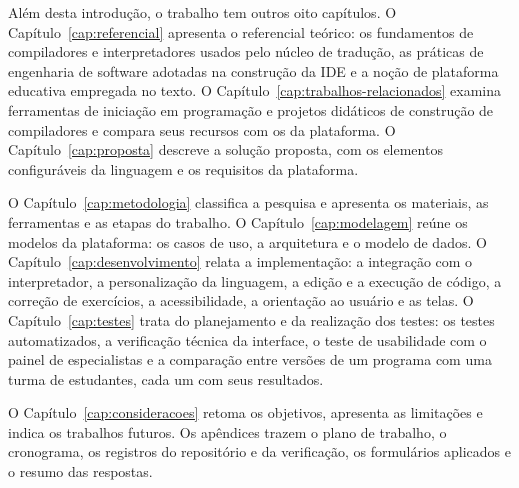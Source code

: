 Além desta introdução, o trabalho tem outros oito capítulos. O Capítulo~\ref{cap:referencial} apresenta o referencial teórico: os fundamentos de compiladores e interpretadores usados pelo núcleo de tradução, as práticas de engenharia de software adotadas na construção da IDE e a noção de plataforma educativa empregada no texto. O Capítulo~\ref{cap:trabalhos-relacionados} examina ferramentas de iniciação em programação e projetos didáticos de construção de compiladores e compara seus recursos com os da plataforma. O Capítulo~\ref{cap:proposta} descreve a solução proposta, com os elementos configuráveis da linguagem e os requisitos da plataforma.

O Capítulo~\ref{cap:metodologia} classifica a pesquisa e apresenta os materiais, as ferramentas e as etapas do trabalho. O Capítulo~\ref{cap:modelagem} reúne os modelos da plataforma: os casos de uso, a arquitetura e o modelo de dados. O Capítulo~\ref{cap:desenvolvimento} relata a implementação: a integração com o interpretador, a personalização da linguagem, a edição e a execução de código, a correção de exercícios, a acessibilidade, a orientação ao usuário e as telas. O Capítulo~\ref{cap:testes} trata do planejamento e da realização dos testes: os testes automatizados, a verificação técnica da interface, o teste de usabilidade com o painel de especialistas e a comparação entre versões de um programa com uma turma de estudantes, cada um com seus resultados.

 O Capítulo~\ref{cap:consideracoes} retoma os objetivos, apresenta as limitações e indica os trabalhos futuros. Os apêndices trazem o plano de trabalho, o cronograma, os registros do repositório e da verificação, os formulários aplicados e o resumo das respostas.
